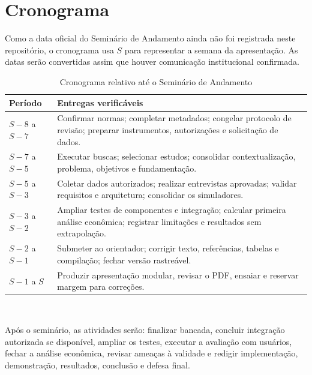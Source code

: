 \section{Cronograma}
\label{sec:cronograma}

Como a data oficial do Seminário de Andamento ainda não foi registrada neste
repositório, o cronograma usa $S$ para representar a semana da apresentação. As
datas serão convertidas assim que houver comunicação institucional confirmada.

\begin{table}[H]
  \centering
  \caption{Cronograma relativo até o Seminário de Andamento}
  \label{tab:cronograma}
  \small
  \begin{tabularx}{\textwidth}{@{}L{2cm}Y@{}}
    \toprule
    \textbf{Período} & \textbf{Entregas verificáveis} \\
    \midrule
    $S-8$ a $S-7$ & Confirmar normas; completar metadados; congelar protocolo de revisão; preparar instrumentos, autorizações e solicitação de dados. \\
    $S-7$ a $S-5$ & Executar buscas; selecionar estudos; consolidar contextualização, problema, objetivos e fundamentação. \\
    $S-5$ a $S-3$ & Coletar dados autorizados; realizar entrevistas aprovadas; validar requisitos e arquitetura; consolidar os simuladores. \\
    $S-3$ a $S-2$ & Ampliar testes de componentes e integração; calcular primeira análise econômica; registrar limitações e resultados sem extrapolação. \\
    $S-2$ a $S-1$ & Submeter ao orientador; corrigir texto, referências, tabelas e compilação; fechar versão rastreável. \\
    $S-1$ a $S$ & Produzir apresentação modular, revisar o PDF, ensaiar e reservar margem para correções. \\
    \bottomrule
  \end{tabularx}
  \\[2pt]\fontepropria
\end{table}

Após o seminário, as atividades serão: finalizar bancada, concluir integração
autorizada se disponível, ampliar os testes, executar a avaliação com usuários,
fechar a análise econômica, revisar ameaças à validade e redigir implementação,
demonstração, resultados, conclusão e defesa final.

